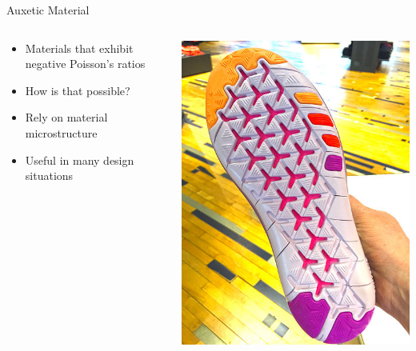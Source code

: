 \documentclass[10pt, svgnames]{beamer}
\begin{document}
\begin{frame}[label={sec:org7b838d6}]{Auxetic Material}
\begin{columns}
\begin{column}{0.5\columnwidth}
\begin{itemize}
\item Materials that exhibit negative Poisson's ratios

\item How is that possible?

\item Rely on material microstructure

\item Useful in many design situations
\end{itemize}
\end{column}

\begin{column}{0.5\columnwidth}
\begin{center}
\begin{center}
\includegraphics[width=.9\linewidth]{./pictures/auxetic-footwear.jpg}
\end{center}
\end{center}
\end{column}
\end{columns}
\end{frame}
\end{document}
